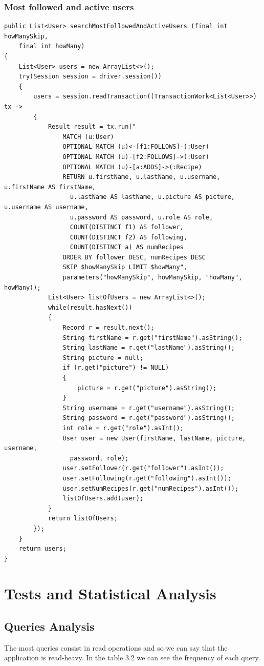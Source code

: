 \documentclass[a4paper]{report}
\begin{document}
\subsubsection{Most followed and active users}
\lstset{language=code}
\begin{lstlisting}
public List<User> searchMostFollowedAndActiveUsers (final int howManySkip, 
	final int howMany)
{
	List<User> users = new ArrayList<>();
	try(Session session = driver.session())
	{
		users = session.readTransaction((TransactionWork<List<User>>)  tx -> 
		{
			Result result = tx.run("
				MATCH (u:User) 
				OPTIONAL MATCH (u)<-[f1:FOLLOWS]-(:User) 
				OPTIONAL MATCH (u)-[f2:FOLLOWS]->(:User) 
				OPTIONAL MATCH (u)-[a:ADDS]->(:Recipe) 
				RETURN u.firstName, u.lastName, u.username, u.firstName AS firstName, 
				  u.lastName AS lastName, u.picture AS picture, u.username AS username, 
				  u.password AS password, u.role AS role, 
				  COUNT(DISTINCT f1) AS follower, 
				  COUNT(DISTINCT f2) AS following, 
				  COUNT(DISTINCT a) AS numRecipes 
				ORDER BY follower DESC, numRecipes DESC 
				SKIP $howManySkip LIMIT $howMany",
				parameters("howManySkip", howManySkip, "howMany", howMany));
			List<User> listOfUsers = new ArrayList<>();
			while(result.hasNext())
			{
				Record r = result.next();
				String firstName = r.get("firstName").asString();
				String lastName = r.get("lastName").asString();
				String picture = null;
				if (r.get("picture") != NULL)
				{
					picture = r.get("picture").asString();
				}
				String username = r.get("username").asString();
				String password = r.get("password").asString();
				int role = r.get("role").asInt();
				User user = new User(firstName, lastName, picture, username, 
				  password, role);
				user.setFollower(r.get("follower").asInt());
				user.setFollowing(r.get("following").asInt());
				user.setNumRecipes(r.get("numRecipes").asInt());
				listOfUsers.add(user);
			}
			return listOfUsers;
		});
	}
	return users;
}
\end{lstlisting}

\section{Tests and Statistical Analysis}
\subsection{Queries Analysis}
The most queries consist in read operations and so we can say that the application is read-heavy. In the table 3.2 we can see the frequency of each query. 
\end{document}
